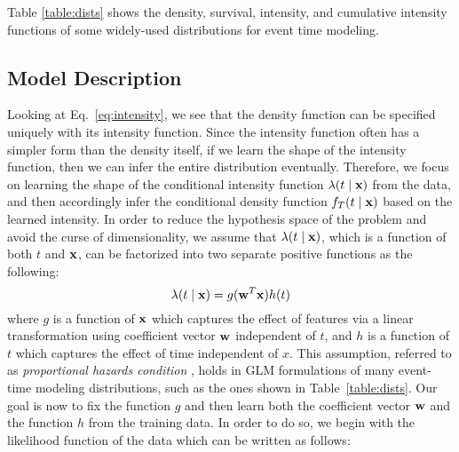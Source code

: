 Table \ref{table:dists} shows the density, survival, intensity, and cumulative intensity functions of some widely-used distributions for event time modeling.

\subsection{Model Description}
Looking at Eq.~\ref{eq:intensity}, we see that the density function can be specified uniquely with its intensity function. Since the intensity function often has a simpler form than the density itself, if we learn the shape of the intensity function, then we can infer the entire distribution eventually. Therefore, we focus on learning the shape of the conditional intensity function $\lambda(t\mid \mathbf{x})$ from the data, and then accordingly infer the conditional density function $f_T(t\mid \mathbf{x})$ based on the learned intensity.
In order to reduce the hypothesis space of the problem and avoid the curse of dimensionality, we assume that $\lambda(t\mid \mathbf{x})$, which is a function of both $t$ and $\mathbf{x}$, can be factorized into two separate positive functions as the following:
\begin{equation}\label{eq:lambda}
\lambda(t\mid \mathbf{x})=g(\mathbf{w}^T\mathbf{x})h(t)
\end{equation}
where $g$ is a function of $\mathbf{x}$ which captures the effect of features via a linear transformation using coefficient vector $\mathbf{w}$ independent of $t$, and $h$ is a function of $t$ which captures the effect of time independent of $x$. This assumption, referred to as \emph{proportional hazards condition} \cite{breslow1975analysis}, holds in GLM formulations of many event-time modeling distributions, such as the ones shown in Table~\ref{table:dists}. Our goal is now to fix the function $g$ and then learn both the coefficient vector $\mathbf{w}$ and the function $h$ from the training data. In order to do so, we begin with the likelihood function of the data which can be written as follows:

